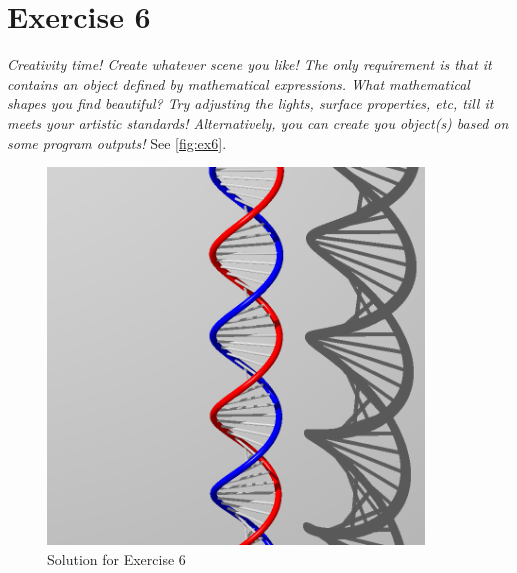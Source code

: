 \section{Exercise 6}
\textit{Creativity time! Create whatever scene you like! The only requirement is that it contains an object defined by mathematical expressions. What mathematical shapes you find beautiful? Try adjusting the lights, surface properties, etc, till it meets your artistic standards! Alternatively, you can create you object(s) based on some program outputs!}
See \autoref{fig:ex6}.

\begin{figure}[h]
  \centering
  \includegraphics[height=10cm]{ex6.png}
  \caption{Solution for Exercise 6}
  \label{fig:ex6}
\end{figure}